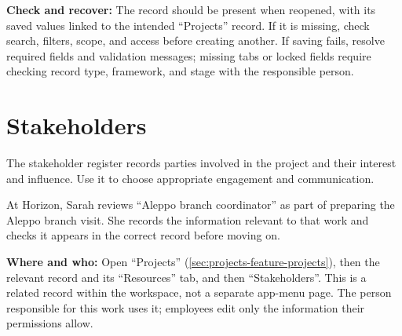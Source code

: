 \textbf{Check and recover:} The record should be present when reopened, with its saved values linked to the intended “Projects” record. If it is missing, check search, filters, scope, and access before creating another. If saving fails, resolve required fields and validation messages; missing tabs or locked fields require checking record type, framework, and stage with the responsible person.

\clearpage
\section{Stakeholders}
\label{sec:projects-feature-stakeholders}

The stakeholder register records parties involved in the project and their interest and influence. Use it to choose appropriate engagement and communication.

\begin{rcnote}
At Horizon, Sarah reviews “Aleppo branch coordinator” as part of preparing the Aleppo branch visit. She records the information relevant to that work and checks it appears in the correct record before moving on.
\end{rcnote}

\textbf{Where and who:} Open “Projects” (\ref{sec:projects-feature-projects}), then the relevant record and its “Resources” tab, and then “Stakeholders”. This is a related record within the workspace, not a separate app-menu page. The person responsible for this work uses it; employees edit only the information their permissions allow.

